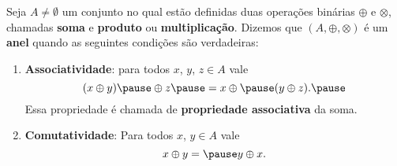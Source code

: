 \documentclass{beamer}
\begin{document}
    \begin{frame}
        \begin{definicao}
            Seja $A \ne \emptyset$ um conjunto \pause no qual estão definidas duas operações binárias
            \pause $\oplus$ \pause e $\otimes$, \pause chamadas \textbf{soma} \pause e \textbf{produto} \pause ou
            \textbf{multiplicação}. \pause Dizemos que $(A, \oplus, \otimes)$ \pause é um \textbf{anel} \pause
            quando as seguintes condições são verdadeiras:\pause
            \begin{enumerate}[label={\roman*})]
                \item \textbf{Associatividade}: \pause para todos $x$, \pause $y$, \pause $z \in A$ \pause vale\pause
                \[
                    (x \oplus y) \pause \oplus z \pause = x \oplus \pause (y \oplus z).\pause
                \]
                Essa propriedade é chamada de \pause \textbf{propriedade associativa} \pause da soma.\pause

                \vspace{.7cm}

                \item \textbf{Comutatividade}: \pause Para todos $x$, \pause $y \in A$ \pause vale\pause
                \[
                    x \oplus y = \pause y \oplus x.
                \]

                \vspace{.7cm}

                \seti
            \end{enumerate}
        \end{definicao}
    \end{frame}
\end{document}
